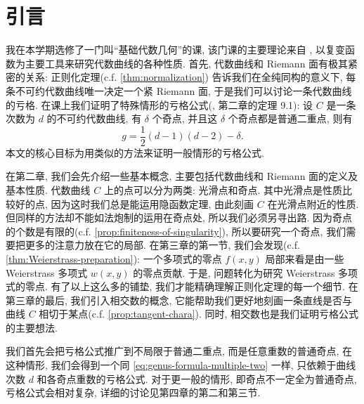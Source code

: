 \chapter{引言}
\label{chap:introduction}
\fontsize{12bp}{14.4pt}

我在本学期选修了一门叫“基础代数几何”的课,
该门课的主要理论来自 \cite{textbook},
以复变函数为主要工具来研究代数曲线的各种性质.
首先, 代数曲线和 Riemann 面有极其紧密的关系:
正则化定理(c.f. \cref{thm:normalization}) 告诉我们在全纯同构的意义下,
每条不可约代数曲线唯一决定一个紧 Riemann 面,
于是我们可以讨论一条代数曲线的亏格.
在课上我们证明了特殊情形的亏格公式(\cite{textbook}, 第二章的定理 9.1):
设 $C$ 是一条次数为 $d$ 的不可约代数曲线,
有 $\delta$ 个奇点, 并且这 $\delta$ 个奇点都是普通二重点, 则有
\begin{equation}
\label{eq:genus-formula-multiple-two}
g = \frac{1}{2}(d-1)(d-2) - \delta.
\end{equation}
本文的核心目标为用类似的方法来证明一般情形的亏格公式.

在第二章, 我们会先介绍一些基本概念,
主要包括代数曲线和 Riemann 面的定义及基本性质.
代数曲线 $C$ 上的点可以分为两类: 光滑点和奇点.
其中光滑点是性质比较好的点, 因为这时我们总是能运用隐函数定理,
由此刻画 $C$ 在光滑点附近的性质.
但同样的方法却不能如法炮制的运用在奇点处,
所以我们必须另寻出路.
因为奇点的个数是有限的(c.f. \cref{prop:finiteness-of-singularity}),
所以要研究一个奇点, 我们需要把更多的注意力放在它的局部.
在第三章的第一节, 我们会发现(c.f. \cref{thm:Weierstrass-preparation}):
一个多项式的零点 $f(x,y)$ 局部来看是由一些 Weierstrass 多项式 $w(x,y)$ 的零点贡献.
于是, 问题转化为研究 Weierstrass 多项式的零点.
有了以上这么多的铺垫, 我们才能精确理解正则化定理的每一个细节.
在第三章的最后, 我们引入相交数的概念,
它能帮助我们更好地刻画一条直线是否与曲线 $C$ 相切于某点(c.f. \cref{prop:tangent-chara}).
同时, 相交数也是我们证明亏格公式的主要想法.

我们首先会把亏格公式推广到不局限于普通二重点,
而是任意重数的普通奇点, 在这种情形,
我们会得到一个同 \cref{eq:genus-formula-multiple-two} 一样,
只依赖于曲线次数 $d$ 和各奇点重数的亏格公式.
对于更一般的情形, 即奇点不一定全为普通奇点,
亏格公式会相对复杂, 详细的讨论见第四章的第二和第三节.
